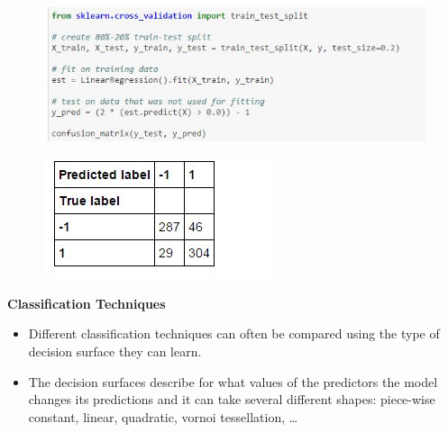 \documentclass[MASTER.tex]{subfiles}
\begin{document}
\begin{frame}
\begin{figure}
\centering
\includegraphics[width=0.99\linewidth]{sklcass/sklclass10}

\end{figure}

\end{frame}
\begin{frame}[fragile]
\begin{figure}
\centering
\includegraphics[width=0.7\linewidth]{sklcass/sklclass11}

\end{figure}

\end{frame}
\begin{frame}[fragile]
\Large
\textbf{Classification Techniques}
\begin{itemize}
\item Different classification techniques can often be compared using the type of decision surface they can learn. \item The decision surfaces describe for what values of the predictors the model changes its predictions and it can take several different shapes: piece-wise constant, linear, quadratic, vornoi tessellation, \ldots
\end{itemize}

\end{frame}
\end{document}
